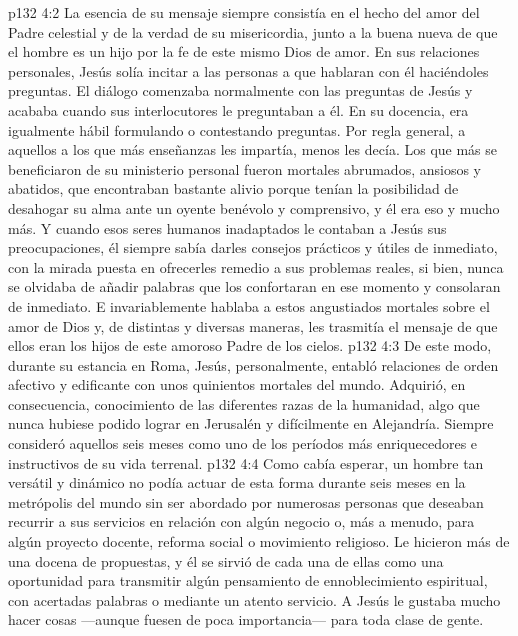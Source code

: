 \vs p132 4:2 La esencia de su mensaje siempre consistía en el hecho del amor del Padre celestial y de la verdad de su misericordia, junto a la buena nueva de que el hombre es un hijo por la fe de este mismo Dios de amor. En sus relaciones personales, Jesús solía incitar a las personas a que hablaran con él haciéndoles preguntas. El diálogo comenzaba normalmente con las preguntas de Jesús y acababa cuando sus interlocutores le preguntaban a él. En su docencia, era igualmente hábil formulando o contestando preguntas. Por regla general, a aquellos a los que más enseñanzas les impartía, menos les decía. Los que más se beneficiaron de su ministerio personal fueron mortales abrumados, ansiosos y abatidos, que encontraban bastante alivio porque tenían la posibilidad de desahogar su alma ante un oyente benévolo y comprensivo, y él era eso y mucho más. Y cuando esos seres humanos inadaptados le contaban a Jesús sus preocupaciones, él siempre sabía darles consejos prácticos y útiles de inmediato, con la mirada puesta en ofrecerles remedio a sus problemas reales, si bien, nunca se olvidaba de añadir palabras que los confortaran en ese momento y consolaran de inmediato. E invariablemente hablaba a estos angustiados mortales sobre el amor de Dios y, de distintas y diversas maneras, les trasmitía el mensaje de que ellos eran los hijos de este amoroso Padre de los cielos.
\vs p132 4:3 De este modo, durante su estancia en Roma, Jesús, personalmente, entabló relaciones de orden afectivo y edificante con unos quinientos mortales del mundo. Adquirió, en consecuencia, conocimiento de las diferentes razas de la humanidad, algo que nunca hubiese podido lograr en Jerusalén y difícilmente en Alejandría. Siempre consideró aquellos seis meses como uno de los períodos más enriquecedores e instructivos de su vida terrenal.
\vs p132 4:4 Como cabía esperar, un hombre tan versátil y dinámico no podía actuar de esta forma durante seis meses en la metrópolis del mundo sin ser abordado por numerosas personas que deseaban recurrir a sus servicios en relación con algún negocio o, más a menudo, para algún proyecto docente, reforma social o movimiento religioso. Le hicieron más de una docena de propuestas, y él se sirvió de cada una de ellas como una oportunidad para transmitir algún pensamiento de ennoblecimiento espiritual, con acertadas palabras o mediante un atento servicio. A Jesús le gustaba mucho hacer cosas ---aunque fuesen de poca importancia--- para toda clase de gente.

